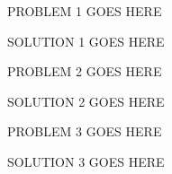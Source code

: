 \documentclass[11pt]{article}
\begin{document}
	

\medskip


\lineacross


\begin{problem}
	PROBLEM 1 GOES HERE
\end{problem}


\begin{solution}
	SOLUTION 1 GOES HERE
\end{solution}


\begin{problem}
	PROBLEM 2 GOES HERE
\end{problem}


\begin{solution}
	SOLUTION 2 GOES HERE
\end{solution}


\begin{problem}
 	PROBLEM 3 GOES HERE
\end{problem}


\begin{solution}
	SOLUTION 3 GOES HERE
\end{solution}
\end{document}
